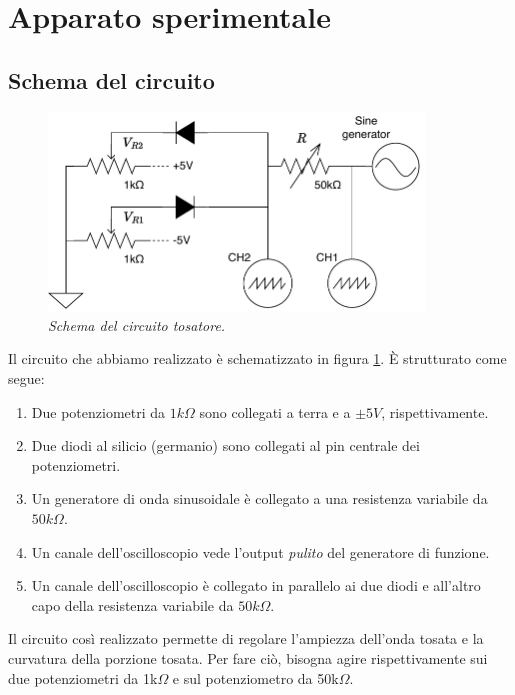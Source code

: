 \section{Apparato sperimentale}\label{sec:apparato-sperimentale}
\subsection{Schema del circuito}\label{subsec:schema-circuito}

\begin{figure}[h]
  \centering
      \includegraphics[width=10cm]{../assets/circuito.drawio.pdf}
      \caption{
        \emph{
          Schema del circuito tosatore.
        }
      }
    \label{fig:circuito}
\end{figure}

Il circuito che abbiamo realizzato è schematizzato in figura \ref{fig:circuito}.
È strutturato come segue:
\begin{enumerate}
  \item%
  Due potenziometri da $1k\Omega$ sono collegati a terra e a $\pm 5V$, rispettivamente.
  \item%
  Due diodi al silicio (germanio) sono collegati al pin centrale dei potenziometri.
  \item%
  Un generatore di onda sinusoidale è collegato a una resistenza variabile da $50k\Omega$.
  \item%
  Un canale dell'oscilloscopio vede l'output \emph{pulito} del generatore di funzione.
  \item%
  Un canale dell'oscilloscopio è collegato in parallelo ai due diodi e all'altro capo della resistenza variabile da $50k\Omega$.
\end{enumerate}
Il circuito così realizzato permette di regolare l'ampiezza dell'onda tosata e la curvatura
della porzione tosata.
Per fare ciò, bisogna agire rispettivamente sui due potenziometri da 1k$\Omega$
e sul potenziometro da 50k$\Omega$.

